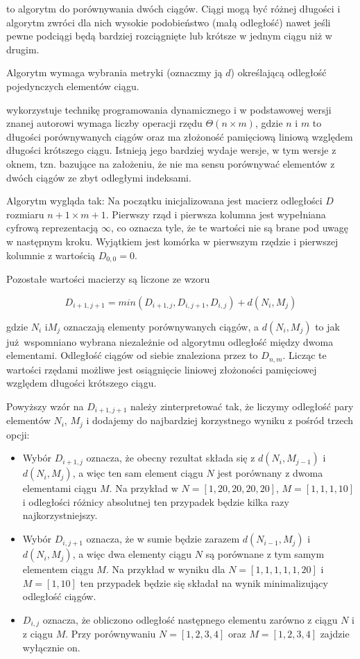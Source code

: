  to algorytm do porównywania dwóch ciągów. Ciągi mogą być różnej długości i algorytm zwróci
dla nich wysokie podobieństwo (małą odległość) nawet jeśli pewne podciągi będą bardziej rozciągnięte lub krótsze 
w jednym ciągu niż w drugim. 

Algorytm wymaga wybrania metryki (oznaczmy ją $d$) określającą odległość pojedynczych elementów ciągu.

 wykorzystuje technikę programowania dynamicznego i w podstawowej wersji znanej autorowi wymaga liczby operacji 
rzędu $\Theta(n \times m)$, gdzie $n$ i $m$ to długości porównywanych ciągów oraz ma złożoność pamięciową liniową
względem długości krótszego ciągu. Istnieją jego bardziej wydaje wersje, w tym wersje z oknem, tzn. bazujące na 
założeniu, że nie ma sensu porównywać elementów z dwóch ciągów ze zbyt odległymi indeksami.

Algorytm wygląda tak: Na początku inicjalizowana jest macierz odległości $D$ rozmiaru $n + 1 \times m + 1$. Pierwszy
rząd i pierwsza kolumna jest wypełniana cyfrową reprezentacją $\infty$, co oznacza tyle, 
że te wartości nie są brane pod uwagę w następnym kroku.
Wyjątkiem jest komórka w pierwszym rzędzie i pierwszej kolumnie z wartością $D_{0,0} = 0$.

Pozostałe wartości macierzy są liczone ze wzoru

$$D_{i+1, j+1} = min(D_{i+1, j}, D_{i, j+1}, D_{i, j}) + d(N_i, M_j)$$

gdzie $N_i$ i$M_j$ oznaczają elementy porównywanych ciągów, a $d(N_i, M_j)$ to jak już wspomniano wybrana 
niezależnie od algorytmu odległość między dwoma elementami. Odległość ciągów od siebie znaleziona przez 
to $D_{n, m}$.  Licząc te wartości rzędami możliwe jest osiągnięcie liniowej złożoności pamięciowej względem
długości krótszego ciągu.

Powyższy wzór na $D_{i+1, j+1}$ należy zinterpretować tak, że liczymy odległość pary elementów $N_i$, $M_j$ i dodajemy
do najbardziej korzystnego wyniku z pośród trzech opcji:

\begin{itemize}
    \item Wybór $D_{i+1, j}$ oznacza, że obecny rezultat składa się z $d(N_i, M_{j-1})$ i $d(N_i, M_j)$, a więc ten sam element ciągu $N$ jest porównany z dwoma elementami ciągu $M$. Na przykład w $N = [1, 20, 20, 20, 20]$, $M = [1, 1, 1, 10]$ i odległości różnicy absolutnej ten przypadek będzie kilka razy najkorzystniejszy.
    \item Wybór $D_{i, j+1}$ oznacza, że w sumie będzie zarazem $d(N_{i-1}, M_j)$ i $d(N_i, M_j)$, a więc dwa elementy ciągu $N$ są porównane z tym samym elementem ciągu $M$. Na przykład w wyniku dla $N = [1, 1, 1, 1, 1, 20]$ i $ M = [1, 10]$ ten przypadek będzie się składał na wynik minimalizujący odległość ciągów.
    \item $D_{i, j}$ oznacza, że obliczono odległość następnego elementu zarówno z ciągu $N$ i z ciągu $M$. Przy porównywaniu $N = [1, 2, 3, 4]$ oraz $M = [1, 2, 3, 4]$ zajdzie wyłącznie on.
\end{itemize}

